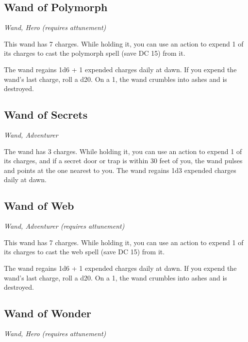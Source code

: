 \subsection{Wand of Polymorph}
\textit{Wand, Hero (requires attunement)}

This wand has 7 charges. While holding it, you can use an action to expend 1 of its charges to cast the polymorph spell (save DC 15) from it.

The wand regains 1d6 + 1 expended charges daily at dawn. If you expend the wand's last charge, roll a d20. On a 1, the wand crumbles into ashes and is destroyed.

\subsection{Wand of Secrets}
\textit{Wand, Adventurer}

The wand has 3 charges. While holding it, you can use an action to expend 1 of its charges, and if a secret door or trap is within 30 feet of you, the wand pulses and points at the one nearest to you. The wand regains 1d3 expended charges daily at dawn.

\subsection{Wand of Web}
\textit{Wand, Adventurer (requires attunement)}

This wand has 7 charges. While holding it, you can use an action to expend 1 of its charges to cast the web spell (save DC 15) from it.

The wand regains 1d6 + 1 expended charges daily at dawn. If you expend the wand's last charge, roll a d20. On a 1, the wand crumbles into ashes and is destroyed.

\subsection{Wand of Wonder}
\textit{Wand, Hero (requires attunement)}

